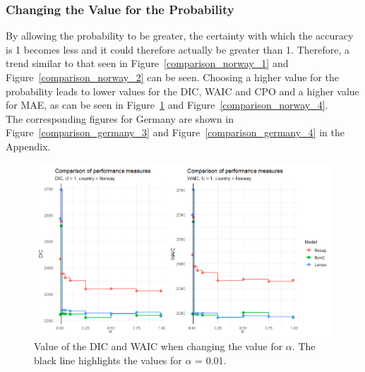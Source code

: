 \subsubsection{Changing the Value for the Probability}
By allowing the probability to be greater, the certainty with which the accuracy is 1 becomes less and it could therefore actually be greater than 1. Therefore, a trend similar to that seen in Figure~\ref{comparison_norway_1} and Figure~\ref{comparison_norway_2} can be seen. Choosing a higher value for the probability leads to lower values for the DIC, WAIC and CPO and a higher value for MAE, as can be seen in Figure~\ref{comparison_norway_3} and Figure~\ref{comparison_norway_4}. \\
The corresponding figures for Germany are shown in Figure~\ref{comparison_germany_3} and Figure~\ref{comparison_germany_4} in the Appendix.
\begin{figure}[H]
    \centering
    \includegraphics[width = \textwidth]{comparison_3_norway.png}
    \caption{Value of the DIC and WAIC when changing the value for $\alpha$. The black line highlights the values for $\alpha$ = 0.01.}
    \label{comparison_norway_3}
\end{figure}
%     
